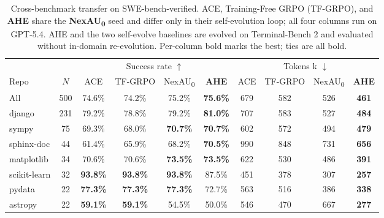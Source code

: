\begin{table}[t]
    \centering
    \small
    \setlength{\tabcolsep}{5pt}
    \renewcommand{\arraystretch}{1.05}
    \caption{Cross-benchmark transfer on SWE-bench-verified. ACE, Training-Free GRPO (TF-GRPO), and \textbf{AHE} share the \textbf{NexAU\textsubscript{0}} seed and differ only in their self-evolution loop; all four columns run on GPT-5.4. AHE and the two self-evolve baselines are evolved on Terminal-Bench 2 and evaluated without in-domain re-evolution. Per-column bold marks the best; ties are all bold.}
    \label{tab:swe-verified-analysis}
    \begin{tabular}{lc @{\hspace{10pt}} cccc @{\hspace{10pt}} cccc}
        \toprule
         &  & \multicolumn{4}{c}{Success rate $\uparrow$} & \multicolumn{4}{c}{Tokens k $\downarrow$} \\
        \cmidrule(lr){3-6} \cmidrule(lr){7-10}
        Repo & $N$
        & ACE & TF-GRPO & NexAU\textsubscript{0} & \textbf{AHE}
        & ACE & TF-GRPO & NexAU\textsubscript{0} & \textbf{AHE} \\
        \midrule
        All            & 500 & 74.6\% & 74.2\% & 75.2\% & \textbf{75.6\%} & 679 & 582 & 526 & \textbf{461} \\
        \midrule
        django         & 231 & 79.2\% & 78.8\% & 79.2\% & \textbf{81.0\%} & 707 & 583 & 527 & \textbf{484} \\
        sympy          &  75 & 69.3\% & 68.0\% & \textbf{70.7\%} & \textbf{70.7\%} & 602 & 572 & 494 & \textbf{479} \\
        sphinx-doc     &  44 & 61.4\% & 65.9\% & 68.2\% & \textbf{70.5\%} & 990 & 848 & 731 & \textbf{656} \\
        matplotlib     &  34 & 70.6\% & 70.6\% & \textbf{73.5\%} & \textbf{73.5\%} & 622 & 530 & 486 & \textbf{391} \\
        scikit-learn   &  32 & \textbf{93.8\%} & \textbf{93.8\%} & \textbf{93.8\%} & 87.5\% & 451 & 378 & 307 & \textbf{257} \\
        pydata         &  22 & \textbf{77.3\%} & \textbf{77.3\%} & \textbf{77.3\%} & 72.7\% & 563 & 516 & 386 & \textbf{338} \\
        astropy        &  22 & \textbf{59.1\%} & \textbf{59.1\%} & 54.5\% & 50.0\% & 546 & 470 & 667 & \textbf{277} \\
        \bottomrule
    \end{tabular}
\end{table}
